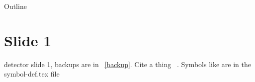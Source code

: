 \begin{frame}{Outline}
  \tableofcontents
\end{frame}

\section{Slide 1}
\begin{frame}{\scifi detector}
 slide 1, backups are in ~\ref{backup}.
Cite a thing ~\cite{Alves:2008zz}.
Symbols like \lhcb are in the symbol-def.tex file
\end{frame}
